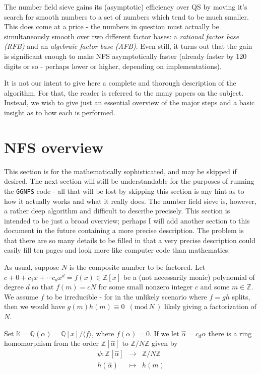 \documentclass[12pt]{article}
\newcommand{\K}{\mathbb{K}}
\newcommand{\Z}{\mathbb{Z}}
\newcommand{\Q}{\mathbb{Q}}
\newcommand{\md}[1]{\,\,\, ( \mathrm{mod}\, #1 \,) }
\newcommand{\ideal}[1]{{\langle #1 \rangle}}
\begin{document}
  The number field sieve gains its (asymptotic) efficiency over QS by
  moving it's search for smooth numbers to a set of numbers which
  tend to be much smaller. This does come at a price - the numbers in
  question must actually be simultaneously smooth over two different factor bases:
  a {\em rational factor base (RFB)} and an {\em algebraic factor base (AFB)}.
  Even still, it turns out that the gain is significant enough to make NFS
  asymptotically faster (already faster by 120 digits or so - perhaps
  lower or higher, depending on implementations).

  It is not our intent to give here a complete and thorough description
  of the algorithm. For that, the reader is referred to the many papers
  on the subject. Instead, we wish to give just an essential overview
  of the major steps and a basic insight as to how each is performed.

\section{NFS overview} \label{sec:nfsoverview}

  This section is for the mathematically sophisticated, and may
  be skipped if desired. The next section will still be understandable
  for the purposes of running the {\tt GGNFS} code - all that will
  be lost by skipping this section is any hint as to how it actually
  works and what it really does. The number field sieve is, however,
  a rather deep algorithm and difficult to describe precisely.
  This section is intended to be just a broad overview; perhaps
  I will add another section to this document in the future
  containing a more precise description. The problem is that
  there are so many details to be filled in that a very precise
  description could easily fill ten pages and look more like
  computer code than mathematics.

  As usual, suppose $N$ is the composite number to be factored.
  Let $c+0+c_1x+\cdots c_dx^d = f(x)\in\Z[x]$ be a 
  (not necessarily monic) polynomial of degree $d$
  so that $f(m)=cN$ for some small nonzero integer $c$ and some
  $m\in\Z$. We assume $f$ to be irreducible - for in the unlikely
  scenario where $f=gh$ splits, then we would have 
  $g(m)h(m)\equiv 0\md{N}$ likely giving a factorization of $N$.

  Set $\K = \Q(\alpha) = \Q[x]/\ideal{f}$, where $f(\alpha)=0$.
  If we let $\hat{\alpha}=c_d\alpha$ there
  is a ring homomorphism from the order $\Z[\hat{\alpha}]$ to $\Z/N\Z$
  given by
  \begin{eqnarray}
    \psi : \Z[\hat{\alpha}] & \longrightarrow & \Z/N\Z \\
           h(\hat{\alpha}) & \longmapsto & h(m)
  \end{eqnarray}
\end{document}

